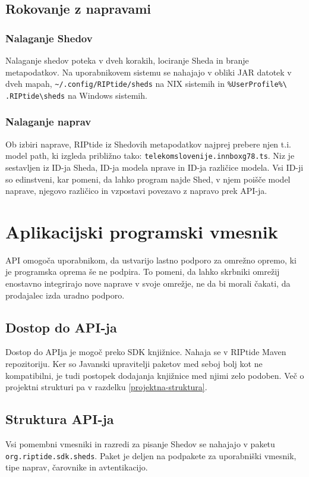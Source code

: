 \documentclass[12pt]{article}
\begin{document}
\subsection{Rokovanje z napravami}
\subsubsection{Nalaganje Shedov} \label{nalaganje-shedov}
Nalaganje shedov poteka v dveh korakih, lociranje Sheda in branje
metapodatkov. Na uporabnikovem sistemu se nahajajo v obliki JAR datotek v
dveh mapah, \texttt{\textasciitilde/.config/RIPtide/sheds} na NIX sistemih
in \texttt{\%UserProfile\%\textbackslash\\.RIPtide\textbackslash sheds} na
Windows sistemih.

\subsubsection{Nalaganje naprav} \label{nalaganje-naprav}
Ob izbiri naprave, RIPtide iz Shedovih metapodatkov najprej prebere
njen t.i. model path, ki izgleda približno
tako: \texttt{telekomslovenije.innboxg78.ts}. Niz je sestavljen iz ID-ja
Sheda, ID-ja modela nprave in ID-ja različice modela. Vsi ID-ji so
edinstveni, kar pomeni, da lahko program najde Shed, v njem poišče model
naprave, njegovo različico in vzpostavi povezavo z napravo prek API-ja.
\newpage

\section{Aplikacijski programski vmesnik}
API omogoča uporabnikom, da ustvarijo lastno podporo za omrežno
opremo, ki je programska oprema še ne podpira. To pomeni, da lahko
skrbniki omrežij enostavno integrirajo nove naprave v svoje omrežje, ne da
bi morali čakati, da prodajalec izda uradno podporo.

\subsection{Dostop do API-ja}
Dostop do APIja je mogoč preko SDK knjižnice. Nahaja se v RIPtide
Maven repozitoriju. Ker so Javanski upravitelji paketov med seboj bolj
kot ne kompatibilni, je tudi postopek dodajanja knjižnice med njimi
zelo podoben. Več o projektni strukturi pa v razdelku
\ref{projektna-struktura}.

\subsection{Struktura API-ja}
Vsi pomembni vmesniki in razredi za pisanje Shedov se nahajajo v
paketu \texttt{org\-.riptide.sdk.sheds}. Paket je deljen na podpakete za
uporabniški vmesnik, tipe naprav, čarovnike in avtentikacijo.
\end{document}

